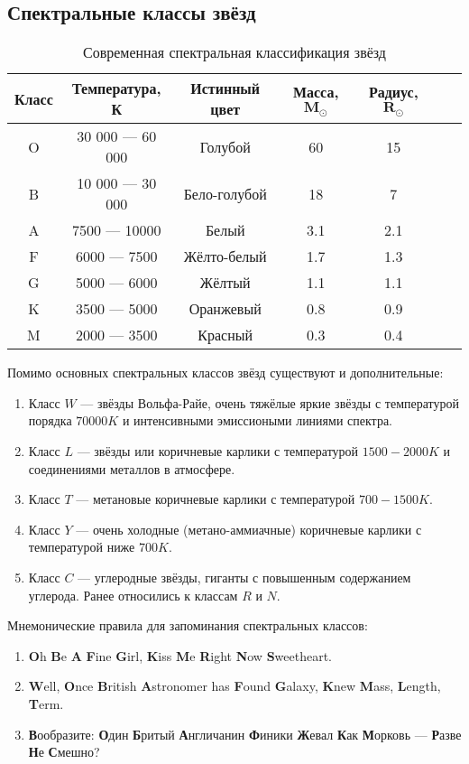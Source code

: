 \subsection{Спектральные классы звёзд}
\begin{center}
\begin{table}[h!]
\begin{tabular}{|c|c|c|c|c|c|c|}
\hline
{\bfseries Класс} & {\bfseries Температура, К} & {\bfseries Истинный цвет} & {\bfseries Масса, $\mathbf{M_{\odot}}$} & {\bfseries Радиус, $\mathbf{R_{\odot}}$}\\
\hline
O & 30 000 --- 60 000 & Голубой & 60 & 15\\
\hline
B & 10 000 --- 30 000 & Бело-голубой & 18 & 7\\
\hline
A & 7500 --- 10000 & Белый & 3.1 & 2.1\\
\hline
F & 6000 --- 7500 & Жёлто-белый & 1.7 & 1.3\\
\hline
G & 5000 --- 6000 & Жёлтый & 1.1 & 1.1\\
\hline 
K & 3500 --- 5000 & Оранжевый & 0.8 & 0.9\\
\hline
M & 2000 --- 3500 & Красный & 0.3 & 0.4\\
\hline
\end{tabular}
\caption{Современная спектральная классификация звёзд}
\end{table}
\end{center}

Помимо основных спектральных классов звёзд существуют и дополнительные:
\begin{enumerate}
\item Класс $W$ --- звёзды Вольфа-Райе, очень тяжёлые яркие звёзды с температурой порядка $70000 K$ и интенсивными эмиссиоными линиями спектра.
\item Класс $L$ --- звёзды или коричневые карлики с температурой $1500 - 2000K$ и соединениями металлов в атмосфере.
\item Класс $T$ --- метановые коричневые карлики с температурой $700 - 1500K$.
\item Класс $Y$ ---  очень холодные (метано-аммиачные) коричневые карлики с температурой ниже $700 K$.
\item Класс $C$ --- углеродные звёзды, гиганты с повышенным содержанием углерода. Ранее относились к классам $R$ и $N$.
\end{enumerate}

Мнемонические правила для запоминания спектральных классов:
\begin{enumerate}
\item\textbf{O}h \textbf{B}e \textbf{A} \textbf{F}ine \textbf{G}irl, \textbf{K}iss \textbf{M}e \textbf{R}ight \textbf{N}ow \textbf{S}weetheart.
\item\textbf{W}ell, \textbf{O}nce \textbf{B}ritish \textbf{A}stronomer has \textbf{F}ound \textbf{G}alaxy, \textbf{K}new \textbf{M}ass, \textbf{L}ength, \textbf{T}erm.
\item \textbf{В}ообразите: \textbf{О}дин \textbf{Б}ритый \textbf{А}нгличанин \textbf{Ф}иники \textbf{Ж}евал \textbf{К}ак \textbf{М}орковь --- \textbf{Р}азве \textbf{Н}е \textbf{С}мешно?
\end{enumerate}
